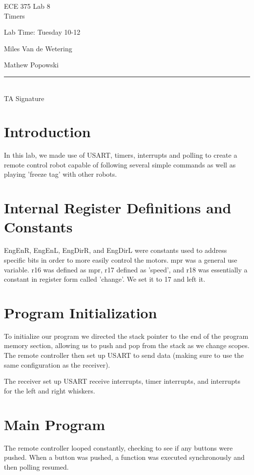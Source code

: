 \documentclass[12pt,letterpaper]{article}
\begin{document}
\begin{titlepage}
    \vspace*{4cm}
    \begin{flushright}
    {\huge
        ECE 375 Lab 8\\[1cm]
    }
    {\large
        Timers
    }
    \end{flushright}
    \begin{flushleft}
    Lab Time: Tuesday 10-12
    \end{flushleft}
    \begin{flushright}
    Miles Van de Wetering

	Mathew Popowski
    \vfill
    \rule{5in}{.5mm}\\
    TA Signature
    \end{flushright}

\end{titlepage}

\section{Introduction}
In this lab, we made use of USART, timers, interrupts and polling to create a remote control robot capable of following several simple commands as well as playing 'freeze tag' with other robots.

\section{Internal Register Definitions and Constants}
EngEnR, EngEnL, EngDirR, and EngDirL were constants used to address specific bits in order to more easily control the motors. mpr was a general use variable. r16 was defined as mpr, r17 defined as 'speed', and r18 was essentially a constant in register form called 'change'. We set it to 17 and left it.


\section{Program Initialization}
To initialize our program we directed the stack pointer to the end of the program memory section, allowing us to push and pop from the stack as we change scopes. The remote controller then set up USART to send data (making sure to use the same configuration as the receiver).

The receiver set up USART receive interrupts, timer interrupts, and interrupts for the left and right whiskers.

\section{Main Program}
The remote controller looped constantly, checking to see if any buttons were pushed. When a button was pushed, a function was executed synchronously and then polling resumed.
\end{document}
